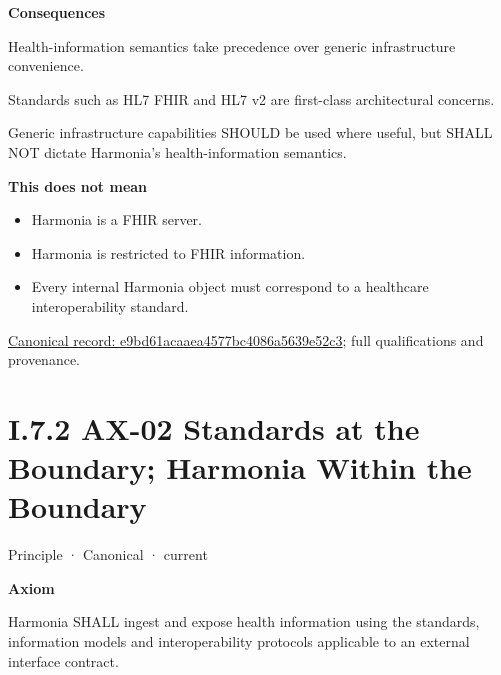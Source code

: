 \par\medskip\textbf{Consequences}\par


Health-information semantics take precedence over generic infrastructure
convenience.



Standards such as HL7 FHIR and HL7 v2 are first-class architectural
concerns.



Generic infrastructure capabilities SHOULD be used where useful, but
SHALL NOT dictate Harmonia's health-information semantics.



\textbf{This does not mean}



\begin{itemize}


\item Harmonia is a FHIR server.

\item Harmonia is restricted to FHIR information.

\item Every internal Harmonia object must correspond to a healthcare interoperability standard.

\end{itemize}

{\footnotesize \href{../../../../../../../../continuum/motivation/principle/e9bd61acaaea4577bc4086a5639e52c3.md}{Canonical record: e9bd61acaaea4577bc4086a5639e52c3}; full qualifications and provenance.}\par
\section*{I.7.2 AX-02 Standards at the Boundary; Harmonia Within the Boundary}
\label{navigation:I.7.2}

\label{element:eee8c3783d964d18a7f9dcea85fcd4cf}
{\small Principle · Canonical · current}\par

\par\medskip\textbf{Axiom}\par


Harmonia SHALL ingest and expose health information using the standards,
information models and interoperability protocols applicable to an
external interface contract.



